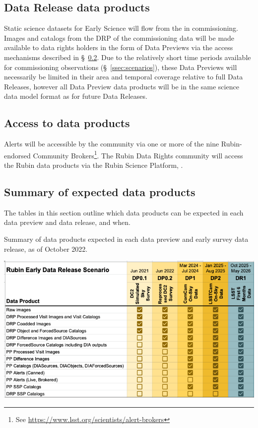 \subsection{Data Release data products}
Static science datasets for Early Science will flow from the \svs in commissioning.
Images and catalogs from the DRP of the commissioning data will be made available to data rights holders in the form of Data Previews via the access mechanisms described in \S~\ref{ssec:dataaccess}.
Due to the relatively short time periods available for commissioning observations (\S~\ref{ssec:scenarios}), these Data Previews will necessarily be limited in their area and temporal coverage relative to full Data Releases, however all Data Preview data products will be in the same science data model format as for future Data Releases.

\subsection{Access to \es data products}\label{ssec:dataaccess}
Alerts will be accessible by the community via one or more of the nine Rubin-endorsed Community Brokers\footnote{See \url{https://www.lsst.org/scientists/alert-brokers}}.
The Rubin Data Rights community will access the Rubin data products via the Rubin Science Platform, \citep{LSE-319}.

\subsection{Summary of expected \es data products}

The tables in this section outline which data products can be expected in each \es data preview and data release, and when.

\begin{table}
\caption{Summary of data products expected in each data preview and early survey data release, as of October 2022.}
\label{tab:summary}
\includegraphics[width=\linewidth]{figures/DPR-summary}
\end{table}

